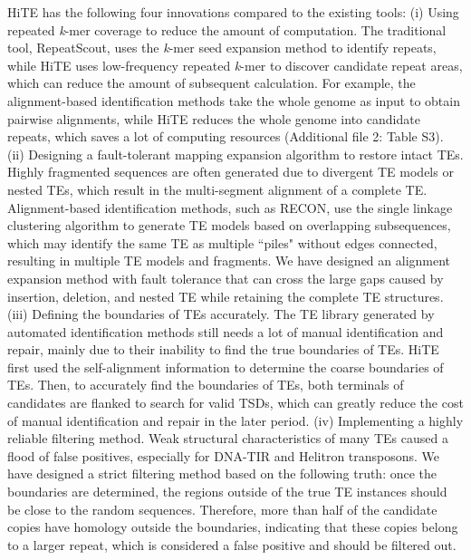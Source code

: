 \documentclass{bmcart}
\begin{document}
HiTE has the following four innovations compared to the existing tools: (i) Using repeated \emph{k}-mer coverage to reduce the amount of computation. The traditional tool, RepeatScout, uses the \emph{k}-mer seed expansion method to identify repeats, while HiTE uses low-frequency repeated \emph{k}-mer to discover candidate repeat areas, which can reduce the amount of subsequent calculation. For example, the alignment-based identification methods take the whole genome as input to obtain pairwise alignments, while HiTE reduces the whole genome into candidate repeats, which saves a lot of computing resources (Additional file 2: Table S3). (ii) Designing a fault-tolerant mapping expansion algorithm to restore intact TEs. Highly fragmented sequences are often generated due to divergent TE models or nested TEs, which result in the multi-segment alignment of a complete TE. Alignment-based identification methods, such as RECON, use the single linkage clustering algorithm to generate TE models based on overlapping subsequences, which may identify the same TE as multiple ``piles" without edges connected, resulting in multiple TE models and fragments. We have designed an alignment expansion method with fault tolerance that can cross the large gaps caused by insertion, deletion, and nested TE while retaining the complete TE structures. (iii) Defining the boundaries of TEs accurately. The TE library generated by automated identification methods still needs a lot of manual identification and repair\cite{storer2022methodologies}, mainly due to their inability to find the true boundaries of TEs. HiTE first used the self-alignment information to determine the coarse boundaries of TEs. Then, to accurately find the boundaries of TEs, both terminals of candidates are flanked to search for valid TSDs, which can greatly reduce the cost of manual identification and repair in the later period. (iv) Implementing a highly reliable filtering method. Weak structural characteristics of many TEs caused a flood of false positives, especially for DNA-TIR and Helitron transposons. We have designed a strict filtering method based on the following truth: once the boundaries are determined, the regions outside of the true TE instances should be close to the random sequences. Therefore, more than half of the candidate copies have homology outside the boundaries, indicating that these copies belong to a larger repeat, which is considered a false positive and should be filtered out.
\end{document}
